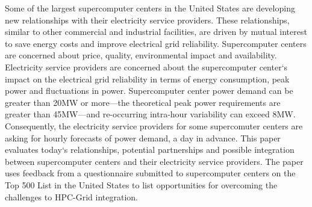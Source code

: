 Some of the largest supercomputer centers in the United States are developing 
new relationships with their electricity service providers. 
These relationships, similar to other commercial and industrial facilities, are 
driven by mutual interest to save energy costs and improve electrical grid reliability.
Supercomputer centers are concerned about price, quality, environmental 
impact and availability.
Electricity service providers are concerned about the supercomputer center`s impact 
on the electrical grid reliability in terms of energy consumption, peak power and fluctuations in power.
Supercomputer center power demand can be greater than 20MW or more---the 
theoretical peak power requirements are greater than 45MW---and re-occurring 
intra-hour variability can exceed 8MW.
Consequently, the electricity service providers for some supercomuter centers
are asking for hourly forecasts of power demand, a day in advance.
This paper evaluates today`s relationships, potential partnerships and possible 
integration between supercomputer centers and their electricity service providers.
The paper uses feedback from a questionnaire submitted to supercomputer centers 
on the Top 500 List in the United States to list opportunities for overcoming the 
challenges to HPC-Grid integration.

